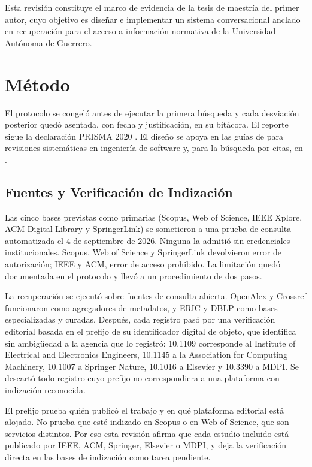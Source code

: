 \documentclass[man,12pt,floatsintext,donotrepeattitle]{apa7}
\begin{document}
Esta revisión constituye el marco de evidencia de la tesis de maestría del primer autor, cuyo objetivo es diseñar e implementar un sistema conversacional anclado en recuperación para el acceso a información normativa de la Universidad Autónoma de Guerrero.

\section{Método}
El protocolo se congeló antes de ejecutar la primera búsqueda y cada desviación posterior quedó asentada, con fecha y justificación, en su bitácora. El reporte sigue la declaración PRISMA 2020 \parencite{page2021}. El diseño se apoya en las guías de \textcite{kitchenham2007} para revisiones sistemáticas en ingeniería de software y, para la búsqueda por citas, en \textcite{wohlin2014}.

\subsection{Fuentes y Verificación de Indización}
Las cinco bases previstas como primarias (Scopus, Web of Science, IEEE Xplore, ACM Digital Library y SpringerLink) se sometieron a una prueba de consulta automatizada el 4 de septiembre de 2026. Ninguna la admitió sin credenciales institucionales. Scopus, Web of Science y SpringerLink devolvieron error de autorización; IEEE y ACM, error de acceso prohibido. La limitación quedó documentada en el protocolo y llevó a un procedimiento de dos pasos.

La recuperación se ejecutó sobre fuentes de consulta abierta. OpenAlex y Crossref funcionaron como agregadores de metadatos, y ERIC y DBLP como bases especializadas y curadas. Después, cada registro pasó por una verificación editorial basada en el prefijo de su identificador digital de objeto, que identifica sin ambigüedad a la agencia que lo registró: 10.1109 corresponde al Institute of Electrical and Electronics Engineers, 10.1145 a la Association for Computing Machinery, 10.1007 a Springer Nature, 10.1016 a Elsevier y 10.3390 a MDPI. Se descartó todo registro cuyo prefijo no correspondiera a una plataforma con indización reconocida.

El prefijo prueba quién publicó el trabajo y en qué plataforma editorial está alojado. No prueba que esté indizado en Scopus o en Web of Science, que son servicios distintos. Por eso esta revisión afirma que cada estudio incluido está publicado por IEEE, ACM, Springer, Elsevier o MDPI, y deja la verificación directa en las bases de indización como tarea pendiente.
\end{document}

